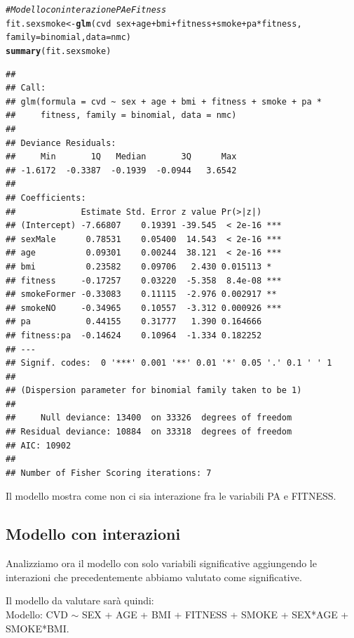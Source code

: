 \documentclass{article}\usepackage[]{graphicx}\usepackage[]{xcolor}
\makeatletter
\newcommand{\hlcom}[1]{\textcolor[rgb]{0.678,0.584,0.686}{\textit{#1}}}%
\newcommand{\hlopt}[1]{\textcolor[rgb]{0,0,0}{#1}}%
\newcommand{\hlstd}[1]{\textcolor[rgb]{0.345,0.345,0.345}{#1}}%
\newcommand{\hlkwb}[1]{\textcolor[rgb]{0.69,0.353,0.396}{#1}}%
\newcommand{\hlkwc}[1]{\textcolor[rgb]{0.333,0.667,0.333}{#1}}%
\newcommand{\hlkwd}[1]{\textcolor[rgb]{0.737,0.353,0.396}{\textbf{#1}}}%
\newenvironment{kframe}{%
 \def\at@end@of@kframe{}%
 \ifinner\ifhmode%
  \def\at@end@of@kframe{\end{minipage}}%
  \begin{minipage}{\columnwidth}%
 \fi\fi%
 \def\FrameCommand##1{\hskip\@totalleftmargin \hskip-\fboxsep
 \colorbox{shadecolor}{##1}\hskip-\fboxsep
     \hskip-\linewidth \hskip-\@totalleftmargin \hskip\columnwidth}%
 \MakeFramed {\advance\hsize-\width
   \@totalleftmargin\z@ \linewidth\hsize
   \@setminipage}}%
 {\par\unskip\endMakeFramed%
 \at@end@of@kframe}
\newenvironment{knitrout}{}{} %
\makeatother
\begin{document}
\begin{knitrout}
\color{fgcolor}\begin{kframe}
\begin{alltt}
\hlcom{#Modello con interazione PA e Fitness}
\hlstd{fit.sexsmoke} \hlkwb{<-} \hlkwd{glm}\hlstd{(cvd}\hlopt{~}\hlstd{sex}\hlopt{+}\hlstd{age}\hlopt{+}\hlstd{bmi}\hlopt{+}\hlstd{fitness}\hlopt{+}\hlstd{smoke}\hlopt{+}\hlstd{pa}\hlopt{*}\hlstd{fitness,}
                    \hlkwc{family}\hlstd{=binomial,} \hlkwc{data}\hlstd{=nmc)}
\hlkwd{summary}\hlstd{(fit.sexsmoke)}
\end{alltt}
\begin{verbatim}
## 
## Call:
## glm(formula = cvd ~ sex + age + bmi + fitness + smoke + pa * 
##     fitness, family = binomial, data = nmc)
## 
## Deviance Residuals: 
##     Min       1Q   Median       3Q      Max  
## -1.6172  -0.3387  -0.1939  -0.0944   3.6542  
## 
## Coefficients:
##             Estimate Std. Error z value Pr(>|z|)    
## (Intercept) -7.66807    0.19391 -39.545  < 2e-16 ***
## sexMale      0.78531    0.05400  14.543  < 2e-16 ***
## age          0.09301    0.00244  38.121  < 2e-16 ***
## bmi          0.23582    0.09706   2.430 0.015113 *  
## fitness     -0.17257    0.03220  -5.358  8.4e-08 ***
## smokeFormer -0.33083    0.11115  -2.976 0.002917 ** 
## smokeNO     -0.34965    0.10557  -3.312 0.000926 ***
## pa           0.44155    0.31777   1.390 0.164666    
## fitness:pa  -0.14624    0.10964  -1.334 0.182252    
## ---
## Signif. codes:  0 '***' 0.001 '**' 0.01 '*' 0.05 '.' 0.1 ' ' 1
## 
## (Dispersion parameter for binomial family taken to be 1)
## 
##     Null deviance: 13400  on 33326  degrees of freedom
## Residual deviance: 10884  on 33318  degrees of freedom
## AIC: 10902
## 
## Number of Fisher Scoring iterations: 7
\end{verbatim}
\end{kframe}
\end{knitrout}
    
    Il modello mostra come non ci sia interazione fra le variabili PA e FITNESS.
  
  \clearpage
  
  \subsection{Modello con interazioni}
    Analizziamo ora il modello con solo variabili significative aggiungendo
    le interazioni che precedentemente abbiamo valutato come significative.\par
    Il modello da valutare sarà quindi:\\
    Modello: CVD $\sim$ SEX + AGE + BMI + FITNESS + SMOKE + SEX*AGE + SMOKE*BMI.
    
\end{document}
